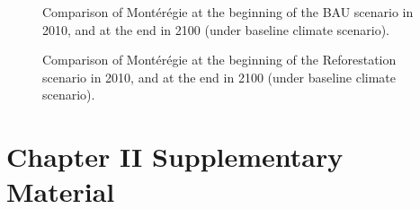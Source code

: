 
\begin{figure}[h!]
 \caption{Comparison of Montérégie at the beginning of the BAU scenario in 2010, and at the end in 2100 (under baseline climate scenario).}
 \label{fig:BAU_compare}
\end{figure}

\begin{figure}[h!]
 \caption{Comparison of Montérégie at the beginning of the Reforestation scenario in 2010, and at the end in 2100 (under baseline climate scenario).}
 \label{fig:Ref_compare}
\end{figure}

\newpage


\chapter*{\textbf{Chapter II Supplementary Material \\ \hspace{1em}}}



